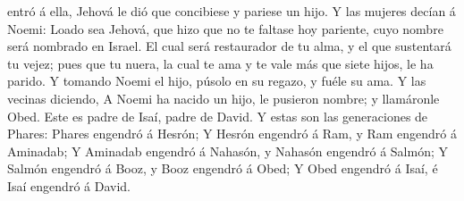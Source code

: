 entró á ella, Jehová le dió que concibiese y pariese un hijo.
 Y las mujeres decían á Noemi: Loado sea Jehová, que hizo
que no te faltase hoy pariente, cuyo nombre será nombrado en Israel.
 El cual será restaurador de tu alma, y el que sustentará
tu vejez; pues que tu nuera, la cual te ama y te vale más que siete
hijos, le ha parido.  Y tomando Noemi el hijo, púsolo en su
regazo, y fuéle su ama.  Y las vecinas diciendo, A Noemi ha
nacido un hijo, le pusieron nombre; y llamáronle Obed. Este es padre de
Isaí, padre de David.  Y estas son las generaciones de
Phares: Phares engendró á Hesrón;  Y Hesrón engendró á Ram,
y Ram engendró á Aminadab;  Y Aminadab engendró á Nahasón,
y Nahasón engendró á Salmón;  Y Salmón engendró á Booz, y
Booz engendró á Obed;  Y Obed engendró á Isaí, é Isaí
engendró á David.
